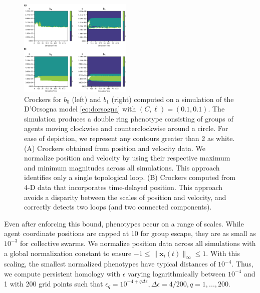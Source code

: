 \documentclass[%
 aip,
reprint,
 amsmath,amssymb,
 aps,
showkeys
]{revtex4-1}
\begin{document}
\begin{figure}[ht]
    \centering
    \includegraphics[width=0.48\textwidth]{Fig2Manu.png}
    \caption{Crockers for $b_0$ (left) and $b_1$ (right) computed on a simulation of the D'Orsogna model \eqref{eq:dorsogna} with $(C, \ell) = (0.1,0.1)$. The simulation produces a double ring phenotype consisting of groups of agents moving clockwise and counterclockwise around a circle. For ease of depiction, we represent any contours greater than 2 as white. (A) Crockers obtained from position and velocity data. We normalize position and velocity by using their respective maximum and minimum magnitudes across all simulations. This approach identifies only a single topological loop. (B) Crockers computed from 4-D data that incorporates time-delayed position. This approach avoids a disparity between the scales of position and velocity, and correctly detects two loops (and two connected components).} \label{fig:crocker_plots}
\end{figure}

Even after enforcing this bound, phenotypes occur on a range of scales. While agent coordinate positions are capped at 10 for group escape, they are as small as $10^{-3}$ for collective swarms. We normalize position data across all simulations with a global normalization constant to ensure $-1\le \| \boldsymbol{x}_i(t)\|_\infty \le1$. With this scaling, the smallest normalized phenotypes have typical distances of $10^{-4}$. Thus, we compute persistent homology with $\epsilon$ varying logarithmically between $10^{-4}$ and 1 with 200 grid points such that $\epsilon_q= 10^{-4+q\Delta\epsilon}, \Delta\epsilon = 4/200, q = 1,...,200$. %
\end{document}
